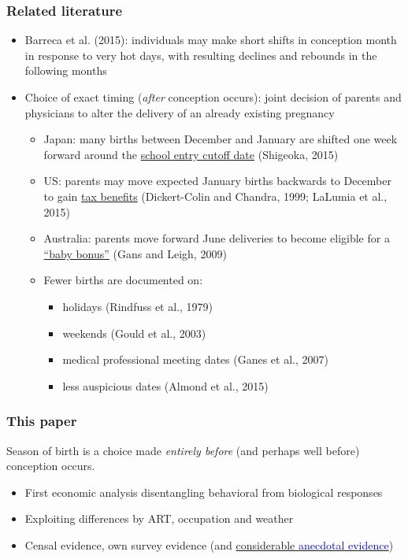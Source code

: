 \documentclass[10pt,letterpaper,subeqn]{beamer}
\begin{document}
\begin{frame}
\frametitle{Related literature}
\begin{itemize}
\item Barreca et al. (2015): individuals may make short shifts in conception month in response to very hot days, with resulting declines and rebounds in the following months
\item Choice of exact timing (\emph{after} conception occurs): joint decision of parents and physicians to alter the delivery of an already existing pregnancy
\begin{itemize}
\item Japan: many births between December and January are shifted one week forward around the \underline{school entry cutoff date} (Shigeoka, 2015)
\item US: parents may move expected January births backwards to December to gain \underline{tax benefits} (Dickert-Colin and Chandra, 1999; LaLumia et al., 2015)
\item Australia: parents move forward June deliveries to become eligible for a \underline{``baby bonus''} (Gans and Leigh, 2009)
\item Fewer births are documented on:
\begin{itemize}
\item holidays (Rindfuss et al., 1979)
\item weekends (Gould et al., 2003)
\item medical professional meeting dates (Ganes et al., 2007)
\item less auspicious dates (Almond et al., 2015)
\end{itemize}
\end{itemize}
\end{itemize}
\end{frame}

\begin{frame}[label=thispaper]
\frametitle{This paper}
Season of birth is a choice made \emph{entirely before} (and perhaps well before) conception occurs.
\vspace{6mm}
\begin{itemize}
\item First economic analysis disentangling behavioral from biological responses
\item Exploiting differences by ART, occupation and weather
\item Censal evidence, own survey evidence (and \hyperlink{anecdotes}{considerable \textcolor{blue}{anecdotal evidence}})
\end{itemize}
\end{frame}
\end{document}
